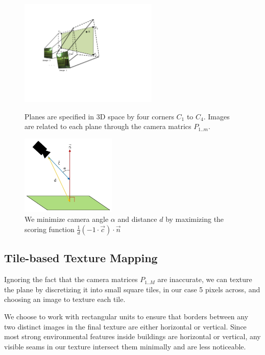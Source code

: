 \documentclass[]{spie}  %
\begin{document}
\begin{figure}[ht]
  \begin{minipage}[b]{0.45\linewidth}
  \centering
  \includegraphics[height=2in]{Projection.pdf}
  \caption{Planes are specified in 3D space by four corners $C_1$ to
    $C_4$. Images are related to each plane through the camera matrics
    $P_{1..m}$. }
  \label{fig:projection}
  \end{minipage}
  \hspace{0.5cm}
  \begin{minipage}[b]{0.45\linewidth}
  \centering
  \includegraphics[height=1.5in]{scoringFunction.jpg}
  \caption{We minimize camera angle $\alpha$ and distance $d$ by
    maximizing the scoring function $\frac{1}{d} (-1 \cdot \vec{c})
    \cdot \vec{n}$}
  \label{fig:scoringFunction}
  \end{minipage}
\end{figure}


\subsection{Tile-based Texture Mapping}
\label{sec:tileBasedMapping}
Ignoring the fact that the camera matrices $P_{1..M}$ are inaccurate,
we can texture the plane by discretizing it into small square tiles,
in our case 5 pixels across, and choosing an image to texture each
tile.

We choose to work with rectangular units to ensure that borders
between any two distinct images in the final texture are either
horizontal or vertical. Since most strong environmental features
inside buildings are horizontal or vertical, any visible seams in our
texture intersect them minimally and are less noticeable.
\end{document}

